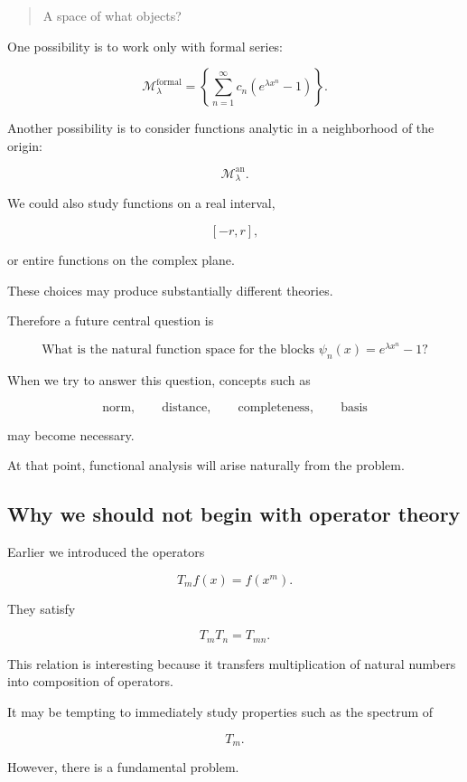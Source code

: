 \begin{quote}
A space of what objects?
\end{quote}

One possibility is to work only with formal series:

\[
\mathcal{M}_{\lambda}^{\mathrm{formal}}
=
\left\{
\sum_{n=1}^{\infty}
c_n(e^{\lambda x^n}-1)
\right\}.
\]

Another possibility is to consider functions analytic in a neighborhood of
the origin:

\[
\mathcal{M}_{\lambda}^{\mathrm{an}}.
\]

We could also study functions on a real interval,

\[
[-r,r],
\]

or entire functions on the complex plane.

These choices may produce substantially different theories.

Therefore a future central question is

\[
\boxed{
\text{What is the natural function space for the blocks }
\psi_n(x)=e^{\lambda x^n}-1?
}
\]

When we try to answer this question, concepts such as

\[
\text{norm},
\qquad
\text{distance},
\qquad
\text{completeness},
\qquad
\text{basis}
\]

may become necessary.

At that point, functional analysis will arise naturally from the problem.

\subsection{Why we should not begin with operator theory}

Earlier we introduced the operators

\[
T_mf(x)=f(x^m).
\]

They satisfy

\[
T_mT_n=T_{mn}.
\]

This relation is interesting because it transfers multiplication of natural
numbers into composition of operators.

It may be tempting to immediately study properties such as the spectrum of

\[
T_m.
\]

However, there is a fundamental problem.

